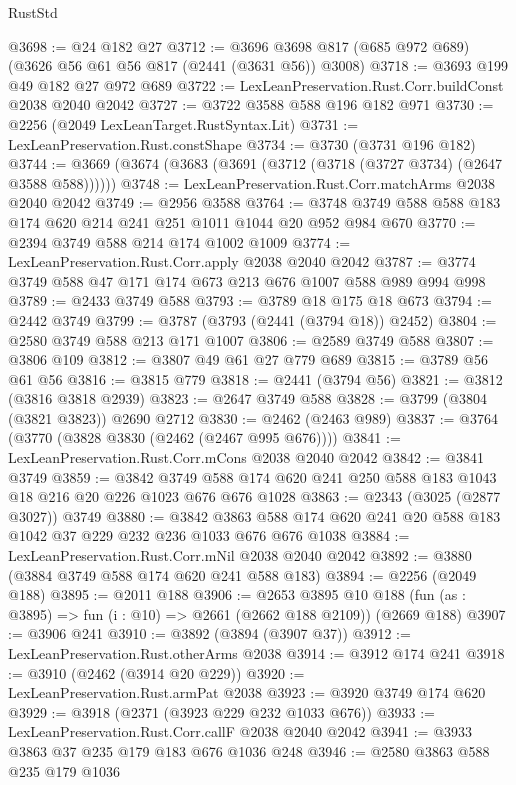 \begin{lexlean}{RustStd}
\begin{coremodule}
@3698 := @24 @182 @27
@3712 := @3696 @3698 @817 (@685 @972 @689) (@3626 @56 @61 @56 @817 (@2441 (@3631 @56)) @3008)
@3718 := @3693 @199 @49 @182 @27 @972 @689
@3722 := LexLeanPreservation.Rust.Corr.buildConst @2038 @2040 @2042
@3727 := @3722 @3588 @588 @196 @182 @971
@3730 := @2256 (@2049 LexLeanTarget.RustSyntax.Lit)
@3731 := LexLeanPreservation.Rust.constShape
@3734 := @3730 (@3731 @196 @182)
@3744 := @3669 (@3674 (@3683 (@3691 (@3712 (@3718 (@3727 @3734) (@2647 @3588 @588))))))
@3748 := LexLeanPreservation.Rust.Corr.matchArms @2038 @2040 @2042
@3749 := @2956 @3588
@3764 := @3748 @3749 @588 @588 @183 @174 @620 @214 @241 @251 @1011 @1044 @20 @952 @984 @670
@3770 := @2394 @3749 @588 @214 @174 @1002 @1009
@3774 := LexLeanPreservation.Rust.Corr.apply @2038 @2040 @2042
@3787 := @3774 @3749 @588 @47 @171 @174 @673 @213 @676 @1007 @588 @989 @994 @998
@3789 := @2433 @3749 @588
@3793 := @3789 @18 @175 @18 @673
@3794 := @2442 @3749
@3799 := @3787 (@3793 (@2441 (@3794 @18)) @2452)
@3804 := @2580 @3749 @588 @213 @171 @1007
@3806 := @2589 @3749 @588
@3807 := @3806 @109
@3812 := @3807 @49 @61 @27 @779 @689
@3815 := @3789 @56 @61 @56
@3816 := @3815 @779
@3818 := @2441 (@3794 @56)
@3821 := @3812 (@3816 @3818 @2939)
@3823 := @2647 @3749 @588
@3828 := @3799 (@3804 (@3821 @3823)) @2690 @2712
@3830 := @2462 (@2463 @989)
@3837 := @3764 (@3770 (@3828 @3830 (@2462 (@2467 @995 @676))))
@3841 := LexLeanPreservation.Rust.Corr.mCons @2038 @2040 @2042
@3842 := @3841 @3749
@3859 := @3842
    @3749
    @588
    @174
    @620
    @241
    @250
    @588
    @183
    @1043
    @18
    @216
    @20
    @226
    @1023
    @676
    @676
    @1028
@3863 := @2343 (@3025 (@2877 @3027)) @3749
@3880 := @3842
    @3863
    @588
    @174
    @620
    @241
    @20
    @588
    @183
    @1042
    @37
    @229
    @232
    @236
    @1033
    @676
    @676
    @1038
@3884 := LexLeanPreservation.Rust.Corr.mNil @2038 @2040 @2042
@3892 := @3880 (@3884 @3749 @588 @174 @620 @241 @588 @183)
@3894 := @2256 (@2049 @188)
@3895 := @2011 @188
@3906 := @2653
    @3895
    @10
    @188
    (fun (as : @3895) => fun (i : @10) => @2661 (@2662 @188 @2109))
    (@2669 @188)
@3907 := @3906 @241
@3910 := @3892 (@3894 (@3907 @37))
@3912 := LexLeanPreservation.Rust.otherArms @2038
@3914 := @3912 @174 @241
@3918 := @3910 (@2462 (@3914 @20 @229))
@3920 := LexLeanPreservation.Rust.armPat @2038
@3923 := @3920 @3749 @174 @620
@3929 := @3918 (@2371 (@3923 @229 @232 @1033 @676))
@3933 := LexLeanPreservation.Rust.Corr.callF @2038 @2040 @2042
@3941 := @3933 @3863 @37 @235 @179 @183 @676 @1036 @248
@3946 := @2580 @3863 @588 @235 @179 @1036

\end{coremodule}
\end{lexlean}
